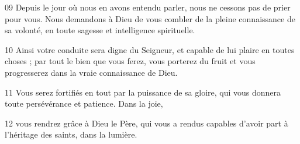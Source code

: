 
09 Depuis le jour où nous en avons entendu parler, nous ne cessons pas de prier pour vous. Nous demandons à Dieu de vous combler de la pleine connaissance de sa volonté, en toute sagesse et intelligence spirituelle.

10 Ainsi votre conduite sera digne du Seigneur, et capable de lui plaire en toutes choses ; par tout le bien que vous ferez, vous porterez du fruit et vous progresserez dans la vraie connaissance de Dieu.

11 Vous serez fortifiés en tout par la puissance de sa gloire, qui vous donnera toute persévérance et patience. Dans la joie,

12 vous rendrez grâce à Dieu le Père, qui vous a rendus capables d’avoir part à l’héritage des saints, dans la lumière.
